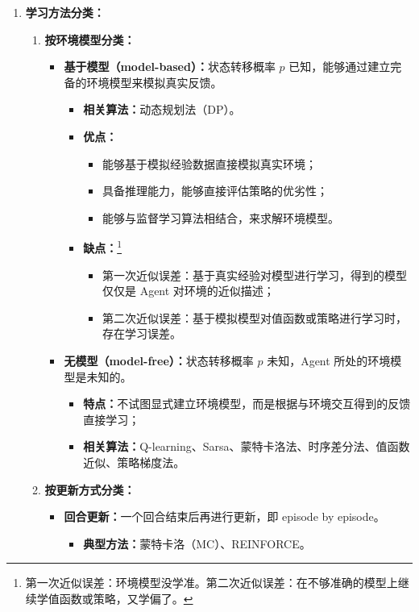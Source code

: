 \documentclass[../main.tex]{subfiles}
\begin{document}
\begin{enumerate}
    \item \textbf{学习方法分类：}
    \begin{enumerate}
        \item \textbf{按环境模型分类：}
        \begin{itemize}
            \item \textbf{基于模型（model-based）：}状态转移概率 $p$ 已知，能够通过建立完备的环境模型来模拟真实反馈。
            \begin{itemize}
                \item \textbf{相关算法：}动态规划法（DP）。
                \item \textbf{优点：}
                \begin{itemize}
                    \item 能够基于模拟经验数据直接模拟真实环境；
                    \item 具备推理能力，能够直接评估策略的优劣性；
                    \item 能够与监督学习算法相结合，来求解环境模型。
                \end{itemize}
                \item \textbf{缺点：}\footnote{第一次近似误差：环境模型没学准。第二次近似误差：在不够准确的模型上继续学值函数或策略，又学偏了。}
                \begin{itemize}
                    \item 第一次近似误差：基于真实经验对模型进行学习，得到的模型仅仅是 Agent 对环境的近似描述；
                    \item 第二次近似误差：基于模拟模型对值函数或策略进行学习时，存在学习误差。
                \end{itemize}
            \end{itemize}
            
            \item \textbf{无模型（model-free）：}状态转移概率 $p$ 未知，Agent 所处的环境模型是未知的。
            \begin{itemize}
                \item \textbf{特点：}不试图显式建立环境模型，而是根据与环境交互得到的反馈直接学习；
                \item \textbf{相关算法：}Q-learning、Sarsa、蒙特卡洛法、时序差分法、值函数近似、策略梯度法。
            \end{itemize}
        \end{itemize}
        
        \item \textbf{按更新方式分类：}
        \begin{itemize}
            \item \textbf{回合更新：}一个回合结束后再进行更新，即 episode by episode。
            \begin{itemize}
                \item \textbf{典型方法：}蒙特卡洛（MC）、REINFORCE。
            \end{itemize}
            

\end{itemize}
\end{enumerate}
\end{enumerate}
\end{document}
